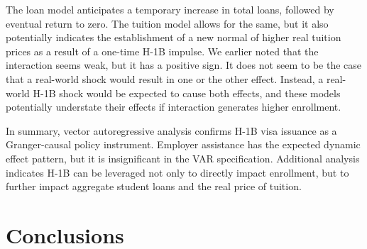 \documentclass[review]{elsarticle}
\begin{document}
    The loan model anticipates a temporary increase in total loans,
    followed by eventual return to zero.
    The tuition model allows for the same,
    but it also potentially indicates the establishment of a new normal
    of higher real tuition prices as a result of a one-time H-1B impulse.
    We earlier noted that the interaction seems weak, but it has a positive sign.
    It does not seem to be the case that a real-world shock would result in one or the other effect.
    Instead, a real-world H-1B shock would be expected to cause both effects,
    and these models potentially understate their effects if interaction generates higher enrollment.

    In summary, vector autoregressive analysis confirms H-1B visa issuance as a Granger-causal policy instrument.
    Employer assistance has the expected dynamic effect pattern, but it is insignificant in the VAR specification.
    Additional analysis indicates H-1B can be leveraged not only to directly impact enrollment,
    but to further impact aggregate student loans and the real price of tuition.

    \section{Conclusions}

\end{document}
